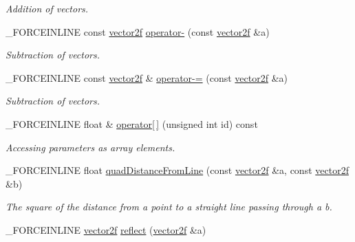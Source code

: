 \begin{DoxyCompactItemize}
\begin{DoxyCompactList}\small\item\em Addition of vectors. \end{DoxyCompactList}\item 
\hypertarget{classbt_1_1vector2f_a150b5d6521ba74849f4421e5885979ba}{\-\_\-\-F\-O\-R\-C\-E\-I\-N\-L\-I\-N\-E const \hyperlink{classbt_1_1vector2f}{vector2f} \hyperlink{classbt_1_1vector2f_a150b5d6521ba74849f4421e5885979ba}{operator-\/} (const \hyperlink{classbt_1_1vector2f}{vector2f} \&a)}\label{classbt_1_1vector2f_a150b5d6521ba74849f4421e5885979ba}

\begin{DoxyCompactList}\small\item\em Subtraction of vectors. \end{DoxyCompactList}\item 
\hypertarget{classbt_1_1vector2f_a18a0178dff3eba09fe28f4e635c7d924}{\-\_\-\-F\-O\-R\-C\-E\-I\-N\-L\-I\-N\-E const \hyperlink{classbt_1_1vector2f}{vector2f} \& \hyperlink{classbt_1_1vector2f_a18a0178dff3eba09fe28f4e635c7d924}{operator-\/=} (const \hyperlink{classbt_1_1vector2f}{vector2f} \&a)}\label{classbt_1_1vector2f_a18a0178dff3eba09fe28f4e635c7d924}

\begin{DoxyCompactList}\small\item\em Subtraction of vectors. \end{DoxyCompactList}\item 
\hypertarget{classbt_1_1vector2f_a4fff1a21e461e7fc6878672c9f949a32}{\-\_\-\-F\-O\-R\-C\-E\-I\-N\-L\-I\-N\-E float \& \hyperlink{classbt_1_1vector2f_a4fff1a21e461e7fc6878672c9f949a32}{operator\mbox{[}$\,$\mbox{]}} (unsigned int id) const }\label{classbt_1_1vector2f_a4fff1a21e461e7fc6878672c9f949a32}

\begin{DoxyCompactList}\small\item\em Accessing parameters as array elements. \end{DoxyCompactList}\item 
\hypertarget{classbt_1_1vector2f_a0d7251c1a8271301af27954f57775d08}{\-\_\-\-F\-O\-R\-C\-E\-I\-N\-L\-I\-N\-E float \hyperlink{classbt_1_1vector2f_a0d7251c1a8271301af27954f57775d08}{quad\-Distance\-From\-Line} (const \hyperlink{classbt_1_1vector2f}{vector2f} \&a, const \hyperlink{classbt_1_1vector2f}{vector2f} \&b)}\label{classbt_1_1vector2f_a0d7251c1a8271301af27954f57775d08}

\begin{DoxyCompactList}\small\item\em The square of the distance from a point to a straight line passing through a b. \end{DoxyCompactList}\item 
\hypertarget{classbt_1_1vector2f_a047c00685764ddb9da418626cc479c38}{\-\_\-\-F\-O\-R\-C\-E\-I\-N\-L\-I\-N\-E \hyperlink{classbt_1_1vector2f}{vector2f} \hyperlink{classbt_1_1vector2f_a047c00685764ddb9da418626cc479c38}{reflect} (\hyperlink{classbt_1_1vector2f}{vector2f} \&a)}\label{classbt_1_1vector2f_a047c00685764ddb9da418626cc479c38}


\end{DoxyCompactItemize}
